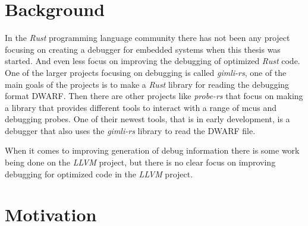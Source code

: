 \section{Background}
In the \emph{Rust} programming language community there has not been any  project focusing on creating a debugger for embedded systems when this thesis was started.
And even less focus on improving the debugging of optimized \emph{Rust} code.
One of the larger projects focusing on debugging is called \emph{gimli-rs}, one of the main goals of the projects is to make a \emph{Rust} library for reading the debugging format \gls{DWARF}.
Then there are other projects like \emph{probe-rs} that focus on making a library that provides different tools to interact with a range of \glspl{mcu} and debugging probes.
One of their newest tools, that is in early development, is a debugger that also uses the \emph{gimli-rs} library to read the \gls{DWARF} file.

When it comes to improving generation of debug information there is some work being done on the \emph{LLVM} project, but there is no clear focus on improving debugging for optimized code in the \emph{LLVM} project.


\section{Motivation}



